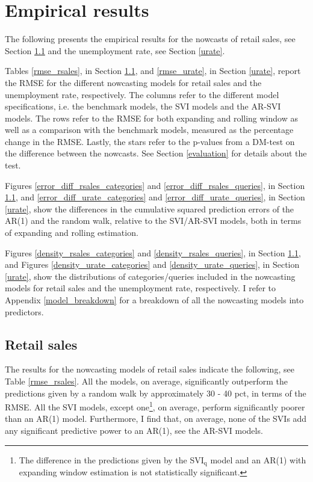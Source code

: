 \section{Empirical results}\label{empirical_results}

The following presents the empirical results for the nowcasts of retail sales, see Section \ref{rsales} and the unemployment rate, see Section \ref{urate}.

Tables \ref{rmse_rsales}, in Section \ref{rsales}, and \ref{rmse_urate}, in Section \ref{urate}, report the RMSE for the different nowcasting models for retail sales and the unemployment rate, respectively. The columns refer to the different model specifications, i.e. the benchmark models, the SVI models and the AR-SVI models. The rows refer to the RMSE for both expanding and rolling window as well as a comparison with the benchmark models, measured as the percentage change in the RMSE. Lastly, the stars refer to the p-values from a DM-test on the difference between the nowcasts. See Section \ref{evaluation} for details about the test.

Figures \ref{error_diff_rsales_categories} and \ref{error_diff_rsales_queries}, in Section \ref{rsales}, and \ref{error_diff_urate_categories} and \ref{error_diff_urate_queries}, in Section \ref{urate}, show the differences in the cumulative squared prediction errors of the AR(1) and the random walk, relative to the SVI/AR-SVI models, both in terms of expanding and rolling estimation.

Figures \ref{density_rsales_categories} and \ref{density_rsales_queries}, in Section \ref{rsales}, and Figures \ref{density_urate_categories} and \ref{density_urate_queries}, in Section \ref{urate}, show the distributions of categories/queries included in the nowcasting models for retail sales and the unemployment rate, respectively. I refer to Appendix \ref{model_breakdown} for a breakdown of all the nowcasting models into predictors.

\subsection{Retail sales}\label{rsales}

The results for the nowcasting models of retail sales indicate the following, see Table \ref{rmse_rsales}. All the models, on average, significantly outperform the predictions given by a random walk by approximately 30 - 40 pct, in terms of the RMSE. All the SVI models, except one\footnote{The difference in the predictions given by the SVI$_{\text{q}}$ model and an AR(1) with expanding window estimation is not statistically significant.}, on average, perform significantly poorer than an AR(1) model.  Furthermore, I find that, on average, none of the SVIs add any significant predictive power to an AR(1), see the AR-SVI models.

